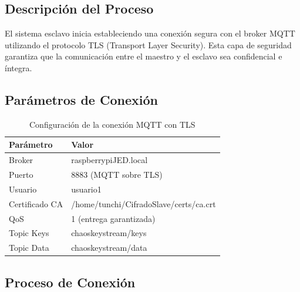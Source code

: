 \documentclass[12pt,a4paper]{article}
\begin{document}
	\subsection{Descripción del Proceso}
	
	El sistema esclavo inicia estableciendo una conexión segura con el broker MQTT utilizando el protocolo TLS (Transport Layer Security). Esta capa de seguridad garantiza que la comunicación entre el maestro y el esclavo sea confidencial e íntegra.
	
	\subsection{Parámetros de Conexión}
	
	\begin{table}[H]
		\centering
		\caption{Configuración de la conexión MQTT con TLS}
		\label{tab:mqtt_config}
		\begin{tabular}{@{}ll@{}}
			\toprule
			\textbf{Parámetro} & \textbf{Valor} \\ \midrule
			Broker & raspberrypiJED.local \\
			Puerto & 8883 (MQTT sobre TLS) \\
			Usuario & usuario1 \\
			Certificado CA & /home/tunchi/CifradoSlave/certs/ca.crt \\
			QoS & 1 (entrega garantizada) \\
			Topic Keys & chaoskeystream/keys \\
			Topic Data & chaoskeystream/data \\ \bottomrule
		\end{tabular}
	\end{table}
	
	\subsection{Proceso de Conexión}
	
\end{document}
